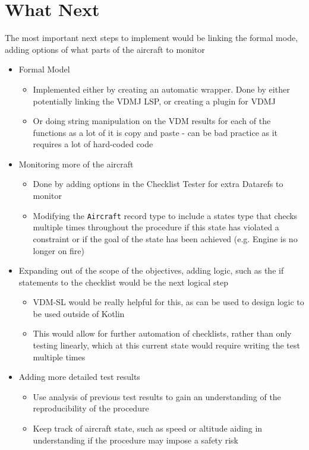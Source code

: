 \documentclass[../dissertation.tex]{subfiles}
\begin{document}
\section{What Next}
The most important next steps to implement would be
linking the formal mode, adding options of what parts of the aircraft
to monitor

\begin{itemize}
  \item Formal Model
  \begin{itemize}
    \item Implemented either by creating an automatic wrapper.
      Done by either potentially linking the VDMJ LSP, or creating a
      plugin for VDMJ
    \item Or doing string manipulation on the VDM results for each of the
      functions as a lot of it is copy and paste - can be bad practice as
      it requires a lot of hard-coded code
  \end{itemize}
  \item Monitoring more of the aircraft
  \begin{itemize}
    \item Done by adding options in the Checklist Tester for extra
      Datarefs to monitor
    \item Modifying the \lstinline|Aircraft| record type to include a
      states type that checks multiple times throughout the procedure
      if this state has violated a constraint or if the goal of the
      state has been achieved (e.g. Engine is no longer on fire)
  \end{itemize}
  \item Expanding out of the scope of the objectives,
    adding logic, such as the if statements to the checklist
    would be the next logical step
  \begin{itemize}
    \item VDM-SL would be really helpful for this, as can be used to
      design logic to be used outside of Kotlin
    \item This would allow for further automation of checklists,
      rather than only testing linearly, which at this current state
      would require writing the test multiple times
  \end{itemize}
  \item Adding more detailed test results
  \begin{itemize}
    \item Use analysis of previous test results to gain an understanding
      of the reproducibility of the procedure
    \item Keep track of aircraft state, such as speed or altitude
      aiding in understanding if the procedure may impose a safety risk 
  \end{itemize}
\end{itemize}
\end{document}
